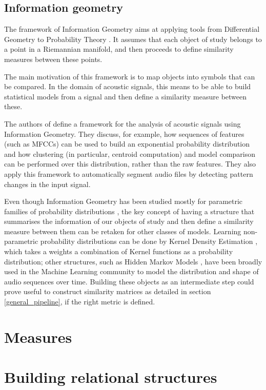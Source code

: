 \documentclass[../main.tex]{subfiles}
\begin{document}
\subsection{Information geometry} \label{subsection_infgeom}
The framework of Information Geometry aims at applying tools from Differential Geometry to Probability Theory \cite{Wang2009}. It assumes that each object of study belongs to a point in a Riemannian manifold, and then proceeds to define similarity measures between these points.
\par The main motivation of this framework is to map objects into symbols that can be compared. In the domain of acoustic signals, this means to be able to build statistical models from a signal and then define a similarity measure between these.
\par The authors of \cite{Cont2011} define a framework for the analysis of acoustic signals using Information Geometry. They discuss, for example, how sequences of features (such as MFCCs) can be used to build an exponential probability distribution and how clustering (in particular, centroid computation) and model comparison can be performed over this distribution, rather than the raw features. They also apply this framework to automatically segment audio files by detecting pattern changes in the input signal.
\par Even though Information Geometry has been studied mostly for parametric families of probability distributions \cite{Amari2001}, the key concept of having a structure that summarises the information of our objects of study and then define a similarity measure between them can be retaken for other classes of models. Learning non-parametric probability distributions can be done by Kernel Density Estimation \cite{Goodall2008}, which takes a weights a combination of Kernel functions as a probability distribution; other structures, such as Hidden Markov Models \cite{Chou2008,Muda2010,Hsieh2009,Wielgat2012}, have been broadly used in the Machine Learning community to model the distribution and shape of audio sequences over time. Building these objects as an intermediate step could prove useful to construct similarity matrices as detailed in section \ref{general_pipeline}, if the right metric is defined.


\section{Measures}\label{measures_review}
\section{Building relational structures}\label{algorithms_review}
\end{document}
